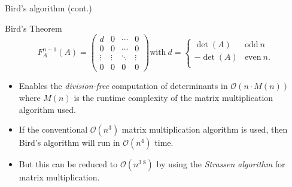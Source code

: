 \documentclass{beamer}
\begin{document}
\begin{frame}{Bird's algorithm (cont.)}

    \begin{block}{Bird's Theorem}
        \[
            F_A^{n-1}(A) =
            \begin{pmatrix}{}
                d      & 0      & \cdots & 0 \\
                0      & 0      & \cdots & 0 \\
                \vdots & \vdots & \ddots & \vdots \\
                0      & 0      & 0      & 0
            \end{pmatrix}
            \text{with} \ d =
            \begin{cases}{}
                \det(A)  & \text{odd} \ n \\
                -\det(A) & \text{even} \ n. \\
            \end{cases}
        \]
    \end{block}

    \begin{itemize}

        \item Enables the \emph{division-free} computation of determinants in
            $\mathcal{O}(n\cdot M(n))$ where $M(n)$ is the runtime complexity of the matrix
            multiplication algorithm used.

        \item If the conventional $\mathcal{O}(n^3)$ matrix multiplication algorithm is used,
            then Bird's algorithm will run in $\mathcal{O}(n^4)$ time.

        \item But this can be reduced to $\mathcal{O}(n^{3.8})$ by using the
            \emph{Strassen algorithm} for matrix multiplication.

    \end{itemize}

\end{frame}
\end{document}
